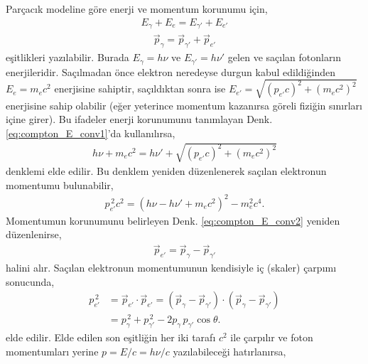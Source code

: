 \documentclass[a4paper,12pt, twoside]{article}
\begin{document}
Parçacık modeline göre enerji ve momentum korunumu için,
\begin{align}
\label{eq:compton_E_conv1}
E_\gamma + E_e = E_{\gamma'} + E_{e'}
\end{align}
\begin{align}
\label{eq:compton_E_conv2}
\vec{p}_\gamma = \vec{p}_{\gamma'} + \vec{p}_{e'}
\end{align}
eşitlikleri yazılabilir. Burada $E_{\gamma} = h\nu$ ve $E_{\gamma'} = h\nu'$ gelen ve saçılan fotonların enerjileridir. Saçılmadan önce elektron neredeyse durgun kabul edildiğinden $E_e = m_ec^2$ enerjisine sahiptir, saçıldıktan sonra ise $E_{e'} = \sqrt{(p_{e'}c)^2 + (m_ec^2)^2}$ enerjisine sahip olabilir (eğer yeterince momentum kazanırsa göreli fiziğin sınırları içine girer). Bu ifadeler  enerji korunumunu tanımlayan Denk. \ref{eq:compton_E_conv1}'da kullanılırsa,
\begin{align}
\label{eq:compton_E_conv3}
h\nu + m_e c^2 = h\nu' + \sqrt{(p_{e'}c)^2 + (m_e c^2)^2}
\end{align}
\noindent denklemi elde edilir. Bu denklem yeniden düzenlenerek saçılan elektronun momentumu bulunabilir,
\begin{align}
\label{eq:compton_E_conv4}
p_{e'}^{\, 2}c^2 = (h\nu - h\nu' + m_{e}c^2)^2-m_{e}^2c^4.
\end{align}
Momentumun korunumunu belirleyen Denk. \ref{eq:compton_E_conv2} yeniden düzenlenirse,
\begin{align}
\label{eq:compton_E_conv5}
\vec{p}_{e'} = \vec{p}_\gamma - \vec{p}_{\gamma'}
\end{align}
halini alır. Saçılan elektronun momentumunun kendisiyle iç (skaler) çarpımı sonucunda,
\begin{align}
\label{eq:compton_E_conv6}
p_{e'}^{\, 2} &= \vec{p}_{e'}\cdot\vec{p}_{e'} = (\vec{p}_\gamma - \vec{p}_{\gamma'}) \cdot (\vec{p}_\gamma - \vec{p}_{\gamma'}) \\
&= p_{\gamma}^{\, 2} + p_{\gamma'}^{\, 2} - 2 p_{\gamma}\, p_{\gamma'} \cos\theta. 
\end{align}
elde edilir. Elde edilen son eşitliğin her iki tarafı $c^2$ ile çarpılır ve foton momentumları yerine $p = E/c = h\nu/c$ yazılabileceği hatırlanırsa,
\end{document}
